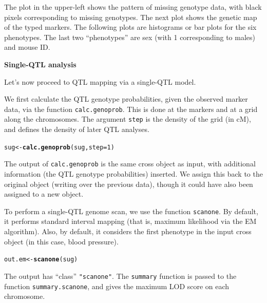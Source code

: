 \documentclass[12pt]{article}\usepackage[]{graphicx}\usepackage[]{color}
\makeatletter
\newcommand{\hlnum}[1]{\textcolor[rgb]{0.686,0.059,0.569}{#1}}%
\newcommand{\hlstd}[1]{\textcolor[rgb]{0.345,0.345,0.345}{#1}}%
\newcommand{\hlkwb}[1]{\textcolor[rgb]{0.69,0.353,0.396}{#1}}%
\newcommand{\hlkwc}[1]{\textcolor[rgb]{0.333,0.667,0.333}{#1}}%
\newcommand{\hlkwd}[1]{\textcolor[rgb]{0.737,0.353,0.396}{\textbf{#1}}}%
\newenvironment{kframe}{%
 \def\at@end@of@kframe{}%
 \ifinner\ifhmode%
  \def\at@end@of@kframe{\end{minipage}}%
  \begin{minipage}{\columnwidth}%
 \fi\fi%
 \def\FrameCommand##1{\hskip\@totalleftmargin \hskip-\fboxsep
 \colorbox{shadecolor}{##1}\hskip-\fboxsep
     \hskip-\linewidth \hskip-\@totalleftmargin \hskip\columnwidth}%
 \MakeFramed {\advance\hsize-\width
   \@totalleftmargin\z@ \linewidth\hsize
   \@setminipage}}%
 {\par\unskip\endMakeFramed%
 \at@end@of@kframe}
\newenvironment{knitrout}{}{} %
\makeatother
\begin{document}
The plot in the upper-left shows the pattern of missing genotype data, with
black pixels corresponding to missing genotypes.  The next plot shows
the genetic map of the typed markers.  The following plots are
histograms or bar plots for the six phenotypes.  The last two
``phenotypes'' are sex (with 1 corresponding to males) and mouse ID.


\bigskip
{\sffamily \textbf{Single-QTL analysis}}
\nopagebreak

Let's now proceed to QTL mapping via a single-QTL model.

We first calculate the QTL genotype probabilities, given the
observed marker data, via the function {\tt calc.genoprob}.  This is
done at the markers and at a grid along the chromosomes.  The argument
{\tt step} is the density of the grid (in cM), and defines the
density of later QTL analyses.

\begin{knitrout}
\color{fgcolor}\begin{kframe}
\begin{alltt}
\hlstd{sug} \hlkwb{<-} \hlkwd{calc.genoprob}\hlstd{(sug,} \hlkwc{step}\hlstd{=}\hlnum{1}\hlstd{)}
\end{alltt}
\end{kframe}
\end{knitrout}

The output of {\tt calc.genoprob} is the same cross object as input,
with additional information (the QTL genotype probabilities) inserted.  We
assign this back to the original object (writing over the previous
data), though it could have also been assigned to a new object.

To perform a single-QTL genome scan, we use the function {\tt scanone}.
By default, it performs standard interval mapping (that is, maximum
likelihood via the EM algorithm).  Also, by default, it considers the
first phenotype in the input cross object (in this case, blood
pressure).

\begin{knitrout}
\color{fgcolor}\begin{kframe}
\begin{alltt}
\hlstd{out.em} \hlkwb{<-} \hlkwd{scanone}\hlstd{(sug)}
\end{alltt}
\end{kframe}
\end{knitrout}

The output has ``class'' {\tt "scanone"}.  The {\tt summary}
function is passed to the function {\tt summary.scanone}, and gives
the maximum LOD score on each chromosome.
\end{document}

